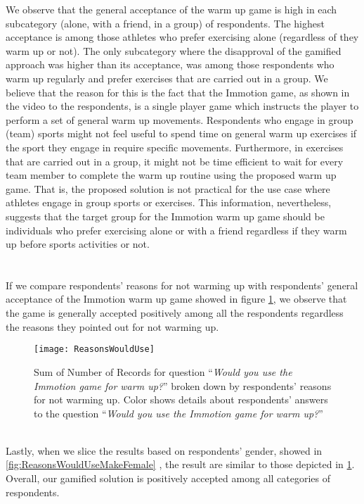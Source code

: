 We observe that the general acceptance of the warm up game is high in each subcategory (alone, with a friend, in a group) of respondents. The highest acceptance is among those athletes who prefer exercising alone (regardless of they warm up or not). The only subcategory where the disapproval of the gamified approach was higher than its acceptance, was among those respondents who warm up regularly and prefer exercises that are carried out in a group. We believe that the reason for this is the fact that the Immotion game, as shown in the video to the respondents, is a single player game which instructs the player to perform a set of general warm up movements. Respondents who engage in group (team) sports might not feel useful to spend time on general warm up exercises if the sport they engage in require specific movements. Furthermore, in exercises that are carried out in a group, it might not be time efficient to wait for every team member to complete the warm up routine using the proposed warm up game. That is, the proposed solution is not practical for the use case where athletes engage in group sports or exercises. This information, nevertheless, suggests that the target group for the Immotion warm up game should be individuals who prefer exercising alone or with a friend regardless if they warm up before sports activities or not.\\\\\\If we compare respondents' reasons for not warming up with respondents' general acceptance of the Immotion warm up game showed in figure \ref{fig:ReasonsWouldUse}, we observe that the game is generally accepted positively among all the respondents regardless the reasons they pointed out for not warming up.
\begin{figure}[h]
    \centering
    \texttt{[image: ReasonsWouldUse]}
    \caption{Sum of Number of Records for question ``\textit{Would you use the Immotion game for warm up?}'' broken down by respondents' reasons for not warming up. Color shows details about respondents' answers to the question ``\textit{Would you use the Immotion game for warm up?}''}
    \label{fig:ReasonsWouldUse}
\end{figure}\\
Lastly, when we slice the results based on respondents' gender, showed in \ref{fig:ReasonsWouldUseMakeFemale} , the result are similar to those depicted in \ref{fig:ReasonsWouldUse}. Overall, our gamified solution is positively accepted among all categories of respondents.\\ 
